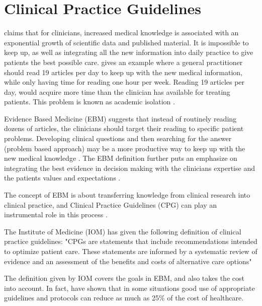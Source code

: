 
\section{Clinical Practice Guidelines}
\textcite{Fervers2010} claims that for clinicians, increased medical knowledge is associated with an exponential growth of scientific data and published material. It is impossible to keep up, as well as integrating all the new information into daily practice to give patients the best possible care.  \textcite{Masic2008} gives an example where a general practitioner should read 19 articles per day to keep up with the new medical information, while only having time for reading one hour per week. Reading 19 articles per day, would acquire more time than the clinician has available for treating patients. This problem is known as academic isolation \parencite{Masic2008}.

Evidence Based Medicine (EBM) suggests that instead of routinely reading dozens of articles, the clinicians should target their reading to specific patient problems. Developing clinical questions and then searching for the answer (problem based approach) may be a more productive way to keep up with the new medical knowledge \parencite{Masic2008}. The EBM definition further puts an emphasize on integrating the best evidence in decision making with the clinicians expertise and the patients values and expectations \parencite{Masic2008}. 

The concept of EBM is about transferring knowledge from clinical research into clinical practice, and Clinical Practice Guidelines (CPG) can play an instrumental role in this process \parencite{Fervers2010}.

The Institute of Medicine (IOM) has given the following definition of clinical practice guidelines: "CPGs are statements that include recommendations intended to optimize patient care. These statements are informed by a systematic review of evidence and an assessment of the benefits and costs of alternative care options" \parencite{Guidelines2011}

The definition given by IOM covers the goals in EBM, and also takes the cost into account. In fact, \textcite{Clayton1995} have shown that in some situations good use of appropriate guidelines and protocols can reduce as much as 25\% of the cost of healthcare.


